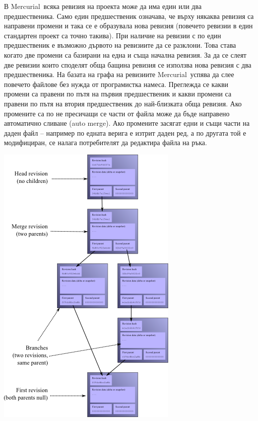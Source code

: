 \documentclass[a4paper]{article}
\def\Hg{Mercurial}
\begin{document}
    В \Hg\ всяка ревизия на проекта може да има един или два предшественика.
    Само един предшественик означава, че върху някаква ревизия са направени
    промени и така се е образувала нова ревизия (повечето ревизии в един
    стандартен проект са точно такива). При наличие на ревизии с по един
    предшественик е възможно дървото на ревизиите да се разклони. Това става когато две
    промени са базирани на една и съща начална ревизия. За да се слеят две
    ревизии които споделят обща бащина ревизия се използва нова ревизия с два
    предшественика. На базата на графа на ревизиите \Hg\ успява да слее повечето
    файлове без нужда от програмистка намеса. Преглежда се какви
    промени са правени по пътя на първия предшественик и какви промени са
    правени по пътя на втория предшественик до най-близката обща ревизия. Ако
    промените са по не пресичащи се части от файла може да бъде направено
    автоматично сливане (auto merge). Ако промените засягат едни и същи части на даден
    файл -- например по едната верига е изтрит даден ред, а по другата
    той е модифициран, се налага потребителят да редактира файла на ръка.

    \begin{center}
      \includegraphics[scale=0.7]{hg_revisions}
    \end{center}
\end{document}
